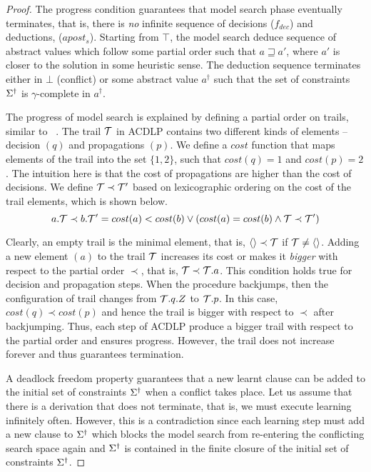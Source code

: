 \begin{proof}
The progress condition guarantees that model search phase eventually terminates, that 
is, there is \emph{no} infinite sequence of decisions ($f_{dec}$) and deductions, 
($apost_s$).  Starting from $\top$, the model search deduce sequence of abstract values 
which follow some partial order such that $a \sqsupseteq a'$, where $a'$ is closer to the 
solution in some heuristic sense.  The deduction sequence terminates either in $\bot$ 
(conflict) or some abstract value $a^\dagger$ such that the set of constraints 
$\Sigma^\dagger$ is $\gamma$-complete in $a^\dagger$.  


The progress of model search is explained by defining a partial order on trails, similar to 
~\cite{mcsat1}. The trail $\mathcal{T}$ in ACDLP contains two different kinds of elements -- 
decision $(q)$ and propagations $(p)$.  We define a $cost$ function that maps elements of 
the trail into the set $\{1,2\}$, such that $cost(q)=1$ and $cost(p)=2$.  The intuition 
here is that the cost of propagations are higher than the cost of decisions.  We define 
$\mathcal{T}\prec \mathcal{T}'$ based on lexicographic ordering on the cost of the trail 
elements, which is shown below.
\[
   a.\mathcal{T} \prec b.\mathcal{T}' = cost(a) < cost(b) \vee (cost(a) = cost(b) \wedge \mathcal{T} \prec \mathcal{T}')
\]

Clearly, an empty trail is the minimal element, that is, $\langle \rangle \prec \mathcal{T}$ if 
$\mathcal{T} \neq \langle \rangle$.  Adding a new element $(a)$ to the trail $\mathcal{T}$ 
increases its cost or makes it \emph{bigger} with respect to the partial order $\prec$, that is, 
$\mathcal{T} \prec \mathcal{T}.a$.  This condition holds true for decision and propagation steps.   
When the procedure backjumps, then the configuration of trail changes from $\mathcal{T}.q.Z$ to $\mathcal{T}.p$.  
In this case, $cost(q) \prec cost(p)$ and hence the trail is bigger with respect to $\prec$ 
after backjumping.  Thus, each step of ACDLP produce a bigger trail with respect to the partial 
order and ensures progress. However, the trail does not increase forever and thus guarantees 
termination.  


A deadlock freedom property guarantees that a new learnt clause can be added to the 
initial set of constraints $\Sigma^\dagger$ when a conflict takes place.  Let us 
assume that there is a derivation that does not terminate, that is, we must execute 
learning infinitely often.  However, this is a contradiction since each learning step 
must add a new clause to $\Sigma^\dagger$ which blocks the model search from re-entering 
the conflicting search space again and $\Sigma^\dagger$ is contained in the finite 
closure of the initial set of constraints $\Sigma^\dagger$. 



\end{proof}
